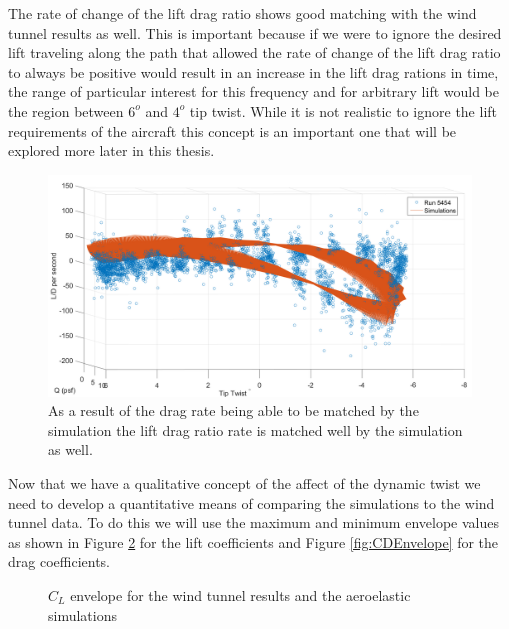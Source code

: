 \documentclass[11pt]{ucthesis}
\begin{document}
The rate of change of the lift drag ratio shows good matching with the wind tunnel results as well. This is important because if we were to ignore the desired lift traveling along the path that allowed the rate of change of the lift drag ratio to always be positive would result in an increase in the lift drag rations in time, the range of particular interest for this frequency and for arbitrary lift would be the region between $6^o$ and $4^o$ tip twist. While it is not realistic to ignore the lift requirements of the aircraft this concept is an important one that will be explored more later in this thesis.

\begin{figure}[h]
\centering
\includegraphics[width=.75\linewidth]{Figures/diffLD5454.png}
\caption{As a result of the drag rate being able to be matched by the simulation the lift drag ratio rate is matched well by the simulation as well.}
\label{fig:dLDdtRun5454}
\end{figure}

Now that we have a qualitative concept of the affect of the dynamic twist we need to develop a quantitative means of comparing the simulations to the wind tunnel data. To do this we will use the maximum and minimum envelope values as shown in Figure \ref{fig:CLEnvelope} for the lift coefficients and Figure \ref{fig:CDEnvelope} for the drag coefficients. 

\begin{figure}
\hfill
{}
\hfill
{}
\hfill
\caption{$C_L$ envelope for the wind tunnel results and the aeroelastic simulations}
\label{fig:CLEnvelope}
\end{figure}
\end{document}
